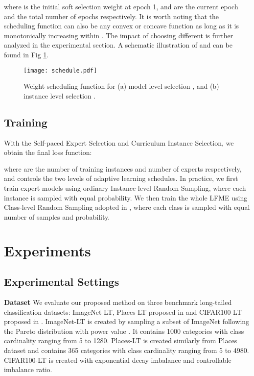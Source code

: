 \documentclass[runningheads]{llncs}
\begin{document}
	where  is the initial soft selection weight at epoch 1, and  are the current epoch and the total number of epochs respectively. It is worth noting that the scheduling function  can also be any convex or concave function as long as it is monotonically increasing within . The impact of choosing different  is further analyzed in the experimental section. A schematic illustration of  and  can be found in Fig \ref{fig:schedule}.
	
	\begin{figure}[htbp!]
		\centering
		\texttt{[image: schedule.pdf]}
		\caption{Weight scheduling function for (a) model level selection , and (b) instance level selection .}
		\label{fig:schedule}
	\end{figure}
	
	
	
	\subsection{Training}
	With the Self-paced Expert Selection and Curriculum Instance Selection, we obtain the final loss function:
	
	where  are the number of training instances and number of experts respectively, and  controls the two levels of adaptive learning schedules. In practice, we first train expert models using ordinary Instance-level Random  Sampling, where each instance  is  sampled with equal probability. We then train the whole LFME using Class-level Random Sampling adopted in \cite{liu2019large,kang2019decoupling}, where each class is sampled with equal number of samples and probability.
	
	


	
	
	


	
	
	\section{Experiments}
	
	\subsection{Experimental Settings}
	\noindent\textbf{Dataset} \quad We evaluate our proposed method on three benchmark long-tailed classification datasets: ImageNet-LT, Places-LT proposed in \cite{liu2019large} and CIFAR100-LT proposed in \cite{cao2019learning}. ImageNet-LT is created by sampling a subset of ImageNet \cite{deng2009imagenet} following the Pareto distribution with power value . It contains 1000 categories with class cardinality ranging from 5 to 1280. Places-LT is created similarly from Places dataset \cite{zhou2017places} and contains 365 categories with class cardinality ranging from 5 to 4980. CIFAR100-LT is created with exponential decay imbalance and controllable imbalance ratio.
	
\end{document}
